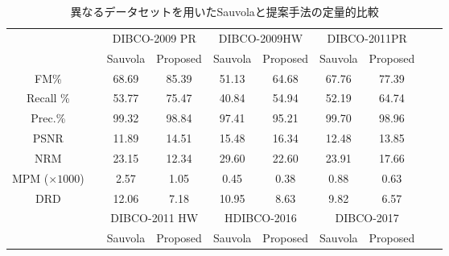 \documentclass[uplatex, twocolumn,10pt]{jsarticle}
\begin{document}
\begin{table*}[tp]
    \centering
    \caption{異なるデータセットを用いたSauvolaと提案手法の定量的比較}
    \label{table3}
    \begin{tabular}{cccccccccc}
        \toprule
                           &  & \multicolumn{2}{c}{DIBCO-2009 PR} & \multicolumn{2}{c}{DIBCO-2009HW} & \multicolumn{2}{c}{DIBCO-2011PR}                                 \\
                           &  & Sauvola                           & Proposed                         & Sauvola                          & Proposed & Sauvola & Proposed \\
        \midrule
        FM\%               &  & 68.69                             & 85.39                            & 51.13                            & 64.68    & 67.76   & 77.39    \\
        Recall \%          &  & 53.77                             & 75.47                            & 40.84                            & 54.94    & 52.19   & 64.74    \\
        Prec.\%            &  & 99.32                             & 98.84                            & 97.41                            & 95.21    & 99.70   & 98.96    \\
        PSNR               &  & 11.89                             & 14.51                            & 15.48                            & 16.34    & 12.48   & 13.85    \\
        NRM                &  & 23.15                             & 12.34                            & 29.60                            & 22.60    & 23.91   & 17.66    \\
        MPM ($\times1000$) &  & 2.57                              & 1.05                             & 0.45                             & 0.38     & 0.88    & 0.63     \\
        DRD                &  & 12.06                             & 7.18                             & 10.95                            & 8.63     & 9.82    & 6.57     \\
        \midrule
                           &  & \multicolumn{2}{c}{DIBCO-2011 HW} & \multicolumn{2}{c}{HDIBCO-2016}  & \multicolumn{2}{c}{DIBCO-2017}                                   \\
                           &  & Sauvola                           & Proposed                         & Sauvola                          & Proposed & Sauvola & Proposed \\

\end{tabular}
\end{table*}
\end{document}
